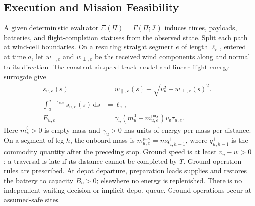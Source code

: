 \subsection{Execution and Mission Feasibility}
\label{subsec:hard_feasibility}

A given deterministic evaluator
$\Xi(\Pi)=\Gamma(\Pi;\mathscr I)$ induces times, payloads, batteries, and
flight-completion statuses from the observed state. Split each path at
wind-cell boundaries. On a resulting straight segment $e$ of length
$\ell_e$, entered at time $a$, let $w_{\parallel,e}$ and $w_{\perp,e}$
be the received wind components along and normal to its direction.
The constant-airspeed track model and linear flight-energy surrogate give
\begin{equation}
\begin{split}
s_{u,e}(s)&=w_{\parallel,e}(s)
+\sqrt{v_u^2-w_{\perp,e}(s)^2},\\
\int_a^{a+\tau_{u,e}}s_{u,e}(s)\,\mathrm ds&=\ell_e,\\
E_{u,e}&=\gamma_u(m_u^0+m_{u,e}^{\mathrm{pay}})v_u\tau_{u,e}.
\end{split}
\label{eq:wind_flight_model}
\end{equation}
Here $m_u^0>0$ is empty mass and $\gamma_u>0$ has units of energy per
mass per distance. On a segment of leg $h$, the onboard mass is
$m_{u,e}^{\mathrm{pay}}=m q_{u,h-1}^{+}$, where $q_{u,h-1}^{+}$ is the
commodity quantity after the preceding stop.
Ground speed is at least $v_u-\bar w>0$; a traversal is late if its
distance cannot be completed by $T$. Ground-operation rules are prescribed.
At depot departure, preparation loads supplies and restores the battery to
capacity $B_u>0$; elsewhere no energy is replenished. There is no independent
waiting decision or implicit depot queue. Ground operations occur at
assumed-safe sites.

